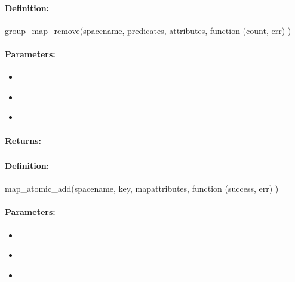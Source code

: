 \paragraph{Definition:}
\begin{javascriptcode}
group_map_remove(spacename, predicates, attributes, function (count, err) {})
\end{javascriptcode}
\paragraph{Parameters:}
\begin{itemize}[noitemsep]
\item {}\\

\item {}\\

\item {}\\

\end{itemize}

\paragraph{Returns:}


\pagebreak
\subsubsection{}
\label{api:nodejs:map_atomic_add}


\paragraph{Definition:}
\begin{javascriptcode}
map_atomic_add(spacename, key, mapattributes, function (success, err) {})
\end{javascriptcode}
\paragraph{Parameters:}
\begin{itemize}[noitemsep]
\item {}\\

\item {}\\

\item {}\\

\end{itemize}

